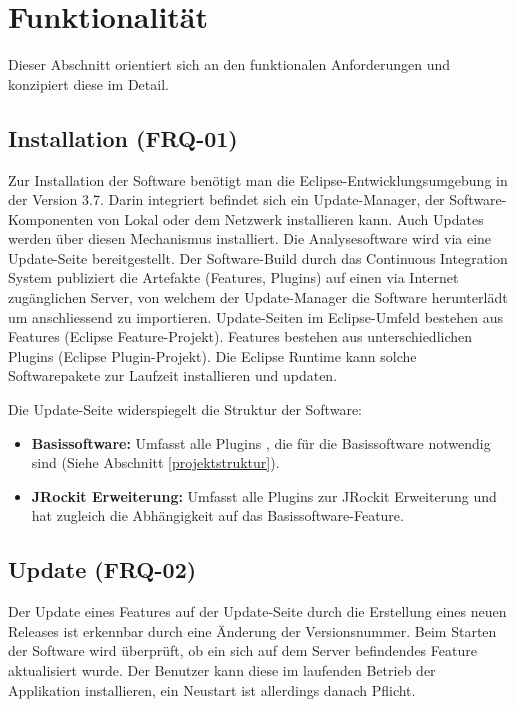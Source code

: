 \chapter{Funktionalität}\label{konzept_2}
Dieser Abschnitt orientiert sich an den funktionalen Anforderungen und konzipiert diese im Detail. 

\section{Installation (FRQ-01)}\label{installation}
Zur Installation der Software benötigt man die Eclipse-Entwicklungsumgebung in der Version 3.7. Darin integriert befindet sich ein Update-Manager, der Software-Komponenten von Lokal oder dem Netzwerk installieren kann. Auch Updates werden über diesen Mechanismus installiert. Die Analysesoftware wird via eine Update-Seite bereitgestellt. Der Software-Build durch das Continuous Integration System publiziert die Artefakte (Features, Plugins) auf einen via Internet zugänglichen Server, von welchem der Update-Manager die Software herunterlädt um anschliessend zu importieren. Update-Seiten im Eclipse-Umfeld bestehen aus Features (Eclipse Feature-Projekt). Features bestehen aus unterschiedlichen Plugins (Eclipse Plugin-Projekt). Die Eclipse Runtime kann solche Softwarepakete zur Laufzeit installieren und updaten.

Die Update-Seite widerspiegelt die Struktur der Software:
\begin{itemize}
\item \textbf{Basissoftware:} Umfasst alle Plugins , die für die Basissoftware notwendig sind (Siehe Abschnitt \ref{projektstruktur}).
\item \textbf{JRockit Erweiterung: }Umfasst alle Plugins zur JRockit Erweiterung und hat zugleich die Abhängigkeit auf das Basissoftware-Feature.
\end{itemize}

\section{Update (FRQ-02)}
Der Update eines Features auf der Update-Seite durch die Erstellung eines neuen Releases ist erkennbar durch eine Änderung der Versionsnummer. Beim Starten der Software wird überprüft, ob ein sich auf dem Server befindendes Feature aktualisiert wurde. Der Benutzer kann diese im laufenden Betrieb der Applikation installieren, ein Neustart ist allerdings danach Pflicht.

